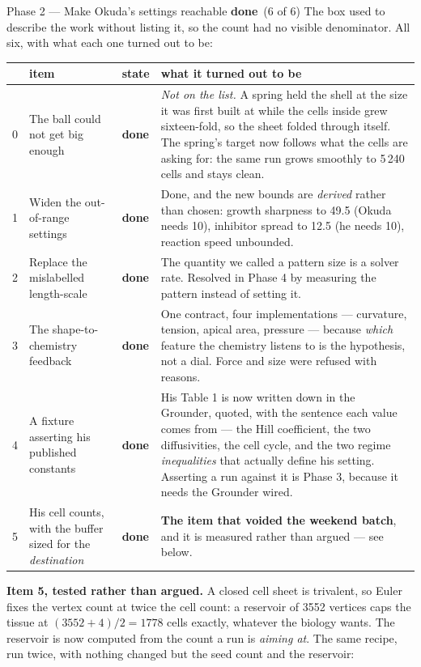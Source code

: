 \documentclass[11pt,a4paper]{article}
\newcommand{\dn}{\textcolor{good}{\textbf{done}}}
\begin{document}
\begin{phasebox}{Phase 2 --- Make Okuda's settings reachable \hfill \dn\ (6 of 6)}
The box used to describe the work without listing it, so the count had no visible
denominator. All six, with what each one turned out to be:

\footnotesize
\begin{tabular}{@{}r@{.\ }p{5.0cm} l p{6.3cm}@{}}
\toprule
& \textbf{item} & \textbf{state} & \textbf{what it turned out to be}\\
\midrule
0 & The ball could not get big enough & \dn &
  \emph{Not on the list.} A spring held the shell at the size it was first built at while the cells
  inside grew sixteen-fold, so the sheet folded through itself. The spring's target now follows
  what the cells are asking for: the same run grows smoothly to 5\,240 cells and stays clean.\\
1 & Widen the out-of-range settings & \dn &
  Done, and the new bounds are \emph{derived} rather than chosen: growth sharpness to 49.5
  (Okuda needs 10), inhibitor spread to 12.5 (he needs 10), reaction speed unbounded.\\
2 & Replace the mislabelled length-scale & \dn &
  The quantity we called a pattern size is a solver rate. Resolved in Phase 4 by measuring the
  pattern instead of setting it.\\
3 & The shape-to-chemistry feedback & \dn &
  One contract, four implementations --- curvature, tension, apical area, pressure --- because
  \emph{which} feature the chemistry listens to is the hypothesis, not a dial. Force and size were
  refused with reasons.\\
4 & A fixture asserting his published constants & \dn &
  His Table 1 is now written down in the Grounder, quoted, with the sentence each value comes
  from --- the Hill coefficient, the two diffusivities, the cell cycle, and the two regime
  \emph{inequalities} that actually define his setting. Asserting a run against it is Phase 3,
  because it needs the Grounder wired.\\
5 & His cell counts, with the buffer sized for the \emph{destination} & \dn &
  \textbf{The item that voided the weekend batch}, and it is measured rather than argued ---
  see below.\\
\bottomrule
\end{tabular}

\normalsize
\textbf{Item 5, tested rather than argued.} A closed cell sheet is trivalent, so Euler fixes the
vertex count at twice the cell count: a reservoir of 3552 vertices caps the tissue at
$(3552{+}4)/2 = 1778$ cells exactly, whatever the biology wants. The reservoir is now computed from
the count a run is \emph{aiming at}. The same recipe, run twice, with nothing changed but the seed
count and the reservoir:


\end{phasebox}
\end{document}
